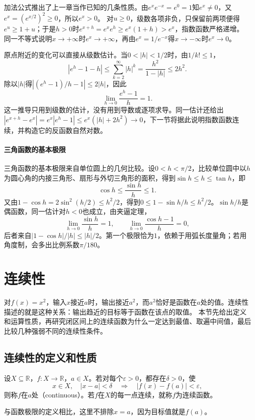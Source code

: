 加法公式推出了上一章当作已知的几条性质。由$e^xe^{-x}=e^0=1$知$e^x\neq0$，又$e^x=(e^{x/2})^2\geq0$，所以$e^x>0$。
对$u\geq0$，级数各项非负，只保留前两项便得$e^u\geq1+u$；于是$h>0$时$e^{x+h}=e^xe^h\geq e^x(1+h)>e^x$，指数函数严格递增。
同一不等式说明$x\to+\infty$时$e^x\to+\infty$，再由$e^x=1/e^{-x}$得$x\to-\infty$时$e^x\to0$。

原点附近的变化可以直接从级数估计。当$0<|h|<1/2$时，由$1/k!\leq1$，
\[
 |e^h-1-h|\leq\sum_{k=2}^\infty|h|^k=\frac{h^2}{1-|h|}\leq2h^2.
\]
除以$|h|$得$|(e^h-1)/h-1|\leq2|h|$，因此
\[
 \lim_{h\to0}\frac{e^h-1}{h}=1.
\]
这一推导只用到级数的估计，没有用到导数或逐项求导。同一估计还给出$|e^{x+h}-e^x|=e^x|e^h-1|\leq e^x(|h|+2h^2)\to0$，下一节将据此说明指数函数连续，并构造它的反函数自然对数。

\paragraph{三角函数的基本极限}
三角函数的基本极限来自单位圆上的几何比较。设$0<h<\pi/2$，比较单位圆中以$h$为圆心角的内接三角形、扇形与外切三角形的面积，得到$\sin h\leq h\leq\tan h$，即
\[
 \cos h\leq\frac{\sin h}h\leq1.
\]
又由$1-\cos h=2\sin^2(h/2)\leq h^2/2$，得到$0\leq1-\sin h/h\leq h^2/2$。$\sin h/h$是偶函数，同一估计对$h<0$也成立，由夹逼定理，
\[
 \lim_{h\to0}\frac{\sin h}h=1,\qquad\lim_{h\to0}\frac{\cos h-1}h=0,
\]
后者来自$|1-\cos h|/|h|\leq|h|/2$。第一个极限恰为$1$，依赖于用弧长度量角；若用角度制，会多出比例系数$\pi/180$。
\section{连续性}
\label{sec:ru-continuity}
\label{sec:analysis-local-models}
\label{sec:analysis-metric-continuity-extrema}

对$f(x)=x^2$，输入$x$接近$a$时，输出接近$a^2$，而$a^2$恰好是函数在$a$处的值。连续性描述的就是这种关系：输出趋近的目标等于函数在该点的取值。
本节先给出定义和运算性质，再研究闭区间上的连续函数为什么一定达到最值、取遍中间值，最后比较几种强弱不同的连续性条件。

\subsection{连续性的定义和性质}
\label{sec:ru-continuity-definition}

\begin{definition}[连续]
\label{def:analysis-continuity}
设$X\subseteq\mathbb R$，$f:X\to\mathbb R$，$a\in X$。若对每个$\varepsilon>0$，都存在$\delta>0$，使
\[
 x\in X,\quad|x-a|<\delta\quad\Longrightarrow\quad|f(x)-f(a)|<\varepsilon,
\]
则称$f$在$a$处（continuous）。若$f$在$X$的每一点连续，就称$f$为连续函数。
\end{definition}
与函数极限的定义相比，这里不排除$x=a$，因为目标值就是$f(a)$。

